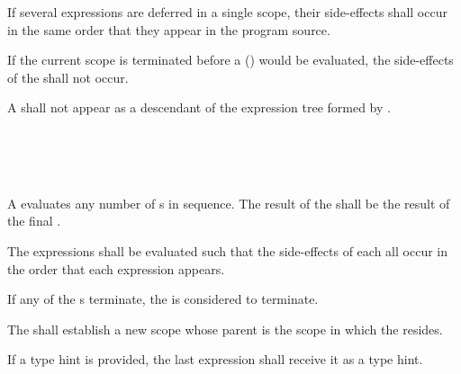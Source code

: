 \specsubsubitem
If several expressions are deferred in a single scope, their side-effects shall
occur in the same order that they appear in the program source.

\specsubsubitem
If the current scope is terminated before a 
() would be
evaluated, the side-effects of the  shall not occur.

\specsubsubitem
A  shall not appear as a descendant of the
expression tree formed by .


\begin{grammar}
 \\
	 \terminal{;} \\
	 \terminal{;}  \\
\end{grammar}

\specsubsubitem
A  evaluates any number of
s in sequence. The result of the
 shall be the result of the final
.

\specsubsubitem
The expressions shall be evaluated such that the side-effects of each all occur
in the order that each expression appears.

\specsubsubitem
If any of the s terminate, the
 is considered to terminate.

\specsubsubitem
The  shall establish a new scope whose parent is
the scope in which the  resides.

\specsubsubitem
If a type hint is provided, the last expression shall receive it as a type hint.


\begin{grammar}
 \\
	  \\
	  \\
	  \\
\end{grammar}

